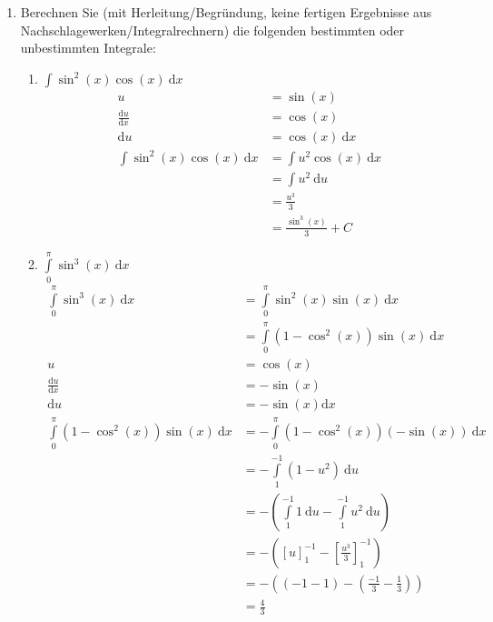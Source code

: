 \documentclass[10pt]{article}
\begin{document}

\noindent
\begin{enumerate}[start=5,leftmargin=1in]

    \item Berechnen Sie (mit Herleitung/Begründung, keine fertigen Ergebnisse aus 
    Nachschlagewerken/Integralrechnern) die folgenden bestimmten oder unbestimmten Integrale:
    \begin{enumerate}

        \item $\int \sin^2{(x)} \cos{(x)} \: \text{d}x$
        \begin{align*}
            u &= \sin(x) \\
            \frac{\text{d}u}{\text{d}x} &= \cos(x) \\
            \text{d}u &= \cos(x) \: \text{d}x \\ 
            \int \sin^2{(x)} \cos{(x)} \: \text{d}x &= \int u^2 \cos(x) \: \text{d}x \\
            &= \int u^2 \: \text{d}u \\
            &= \frac{u^3}{3} \\
            &= \frac{\sin^3(x)}{3} + C
        \end{align*}

        \item $\int\limits_{0}^{\pi} \sin^3(x) \: \text{d}x$
        \begin{align*}
            \int\limits_{0}^{\pi} \sin^3(x) \: \text{d}x &= \int\limits_{0}^{\pi} \sin^2(x) \sin(x) \: \text{d}x \\
            &= \int\limits_{0}^{\pi} (1 - \cos^2(x)) \sin(x) \: \text{d}x \\
            u &= \cos(x) \\
            \frac{\text{d}u}{\text{d}x} &= - \sin(x) \\
            \text{d}u &= - \sin(x) \text{d}x \\
            \int\limits_{0}^{\pi} (1 - \cos^2(x)) \sin(x) \: \text{d}x &= - \int\limits_{0}^{\pi} (1 - \cos^2(x)) (-\sin(x)) \: \text{d}x \\
            &= - \int\limits_{1}^{-1} (1 - u^2) \: \text{d}u \\
            &= - \left(\int\limits_{1}^{-1} 1 \: \text{d}u - \int\limits_{1}^{-1} u^2 \: \text{d}u\right) \\
            &= - \left(\left[u\right]_{1}^{-1} - \left[\frac{u^3}{3}\right]_{1}^{-1}\right) \\
            &= - \left((-1 - 1) - \left(\frac{-1}{3} - \frac{1}{3}\right)\right) \\
            &= \frac{4}{3}
        \end{align*}


\end{enumerate}
\end{enumerate}
\end{document}
